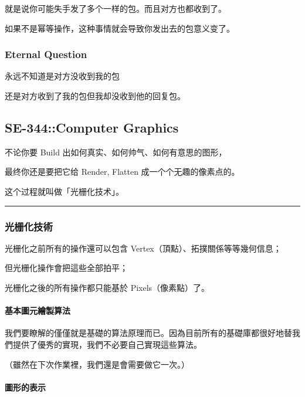 \documentclass[
]{article}
\begin{document}
就是说你可能失手发了多个一样的包。而且对方也都收到了。

如果不是幂等操作，这种事情就会导致你发出去的包意义变了。

\hypertarget{header-n80}{%
\subsubsection{Eternal Question}\label{header-n80}}

永远不知道是对方没收到我的包

还是对方收到了我的包但我却没收到他的回复包。

\hypertarget{header-n83}{%
\subsection{SE-344::Computer Graphics}\label{header-n83}}

不论你要 Build 出如何真实、如何帅气、如何有意思的图形，

最终你还是要把它给 Render, Flatten 成一个个无趣的像素点的。

这个过程就叫做「光栅化技术」。

\begin{center}\rule{0.5\linewidth}{\linethickness}\end{center}

\hypertarget{header-n88}{%
\subsubsection{光栅化技術}\label{header-n88}}

光栅化之前所有的操作還可以包含 Vertex（頂點）、拓撲關係等等幾何信息；

但光栅化操作會把這些全部拍平；

光栅化之後的所有操作都只能基於 Pixels（像素點）了。

\hypertarget{header-n92}{%
\paragraph{基本圖元繪製算法}\label{header-n92}}

我們要瞭解的僅僅就是基礎的算法原理而已。因為目前所有的基礎庫都很好地替我們提供了優秀的實現，我們不必要自己實現這些算法。

（雖然在下次作業裡，我們還是會需要做它一次。）

\hypertarget{header-n95}{%
\paragraph{圖形的表示}\label{header-n95}}
\end{document}
